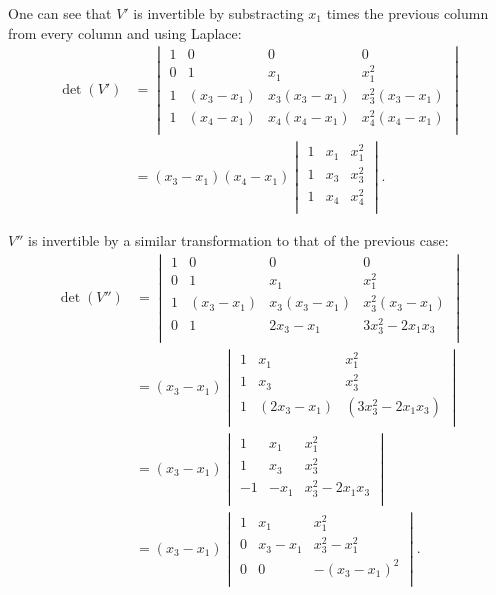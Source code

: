 	One can see that $V'$ is invertible by substracting $x_1$ times the previous column from every column and using Laplace:
	\begin{align*}\det (V') &=
		\begin{vmatrix}
			1 & 0 & 0 & 0\\
			0 & 1 & x_1 & x_1^2\\
			1 & (x_3-x_1) & x_3(x_3-x_1) & x_3^2(x_3-x_1)\\
			1 & (x_4-x_1) & x_4(x_4-x_1) & x_4^2(x_4-x_1)\\
		\end{vmatrix}
		\\
		&= (x_3-x_1)(x_4-x_1)
		\begin{vmatrix}
			1 & x_1 & x_1^2\\
			1 & x_3 & x_3^2\\
			1 & x_4 & x_4^2\\
		\end{vmatrix}.
	\end{align*}



	$V''$ is invertible by a similar transformation to that of the previous case:
		\begin{align*}\det (V'') &= 
		\begin{vmatrix}
			1 & 0 & 0 & 0\\
			0 & 1 & x_1 & x_1^2\\
			1 & (x_3-x_1) & x_3(x_3-x_1) & x_3^2(x_3-x_1)\\
			0 & 1 & 2x_3 - x_1 & 3x_3^2-2x_1x_3\\
		\end{vmatrix}
		\\
		&= (x_3-x_1)
		\begin{vmatrix}
			1 & x_1 & x_1^2\\
			1 & x_3 & x_3^2\\
			1 & (2x_3 - x_1) & (3x_3^2-2x_1x_3)\\
		\end{vmatrix}
		\\
		&= (x_3-x_1)
		\begin{vmatrix}
			1 & x_1 & x_1^2\\
			1 & x_3 & x_3^2\\
			-1 & - x_1 & x_3^2-2x_1 x_3\\
		\end{vmatrix}
		\\		
		&= (x_3-x_1)
		\begin{vmatrix}
			1 & x_1 & x_1^2\\
			0 & x_3-x_1 & x_3^2-x_1^2\\
			0 & 0 & -(x_3-x_1)^2\\
		\end{vmatrix}.
	\end{align*}




